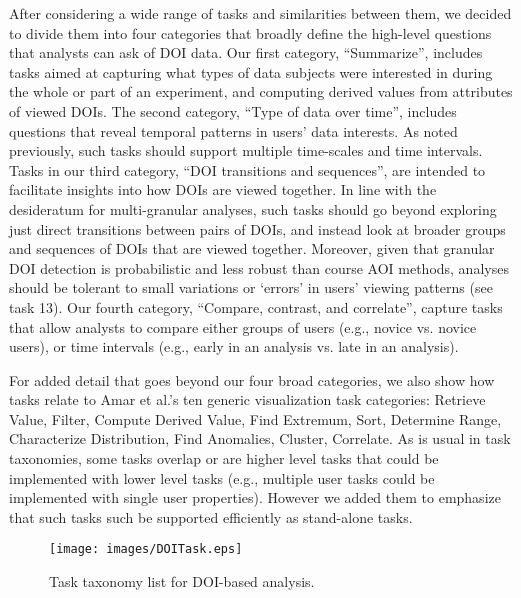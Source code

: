 After considering a wide range of tasks and similarities between them, we decided to divide them into four categories that broadly define the high-level questions that analysts can ask of DOI data. Our first category, ``Summarize'', includes tasks aimed at capturing what types of data subjects were interested in during the whole or part of an experiment, and computing derived values from attributes of viewed DOIs.  The second category, ``Type of data over time'', includes questions that reveal temporal patterns in users' data interests. As noted previously, such tasks should support multiple time-scales and time intervals. Tasks in our third category, ``DOI transitions and sequences'', are intended to facilitate insights into how DOIs are viewed together. In line with the desideratum for multi-granular analyses, such tasks should go beyond exploring just direct transitions between pairs of DOIs, and instead look at broader groups and sequences of DOIs that are viewed together. Moreover, given that granular DOI detection is probabilistic and less robust than course AOI methods, analyses should be tolerant to small variations or `errors' in users' viewing patterns (see task 13). Our fourth category, ``Compare, contrast, and correlate'', capture tasks that allow analysts to compare either groups of users (e.g., novice vs. novice users), or time intervals (e.g., early in an analysis vs. late in an analysis).

For added detail that goes beyond our four broad categories, we also show how tasks relate to Amar et al.'s ten generic visualization task categories: Retrieve Value, Filter, Compute Derived Value, Find Extremum, Sort, Determine Range, Characterize Distribution, Find Anomalies, Cluster, Correlate. As is usual in task taxonomies, some tasks overlap or are higher level tasks that could be implemented with lower level tasks (e.g., multiple user tasks could be implemented with single user properties). However we added them to emphasize that such tasks such be supported efficiently as stand-alone tasks.

\begin{figure*}[!htb]
  \centering
  \texttt{[image: images/DOITask.eps]}
  \caption{Task taxonomy list for DOI-based analysis. }
	\label{fig:taxonomy}
\end{figure*}

